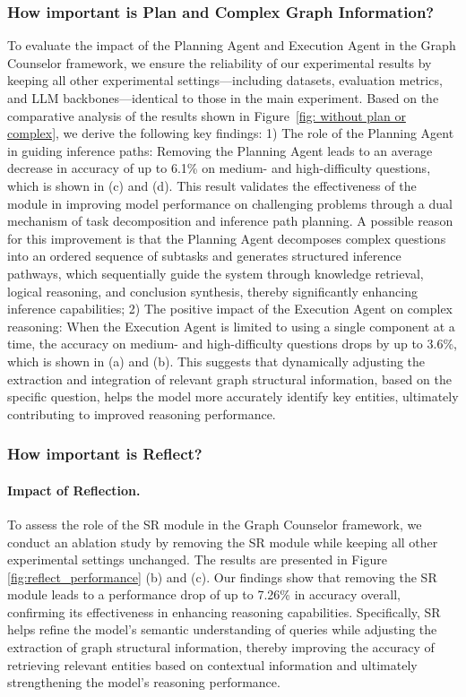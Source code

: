 \documentclass[11pt]{article}
\begin{document}
\subsubsection{How important is Plan and Complex Graph Information?}
To evaluate the impact of the Planning Agent and Execution Agent in the Graph Counselor framework, we ensure the reliability of our experimental results by keeping all other experimental settings—including datasets, evaluation metrics, and LLM backbones—identical to those in the main experiment. Based on the comparative analysis of the results shown in Figure~\ref{fig: without plan or complex}, we derive the following key findings: 1) The role of the Planning Agent in guiding inference paths: Removing the Planning Agent leads to an average decrease in accuracy of up to 6.1\% on medium- and high-difficulty questions, which is shown in (c) and (d). This result validates the effectiveness of the module in improving model performance on challenging problems through a dual mechanism of task decomposition and inference path planning. A possible reason for this improvement is that the Planning Agent decomposes complex questions into an ordered sequence of subtasks and generates structured inference pathways, which sequentially guide the system through knowledge retrieval, logical reasoning, and conclusion synthesis, thereby significantly enhancing inference capabilities; 2) The positive impact of the Execution Agent on complex reasoning: When the Execution Agent is limited to using a single component at a time, the accuracy on medium- and high-difficulty questions drops by up to 3.6\%, which is shown in (a) and (b). This suggests that dynamically adjusting the extraction and integration of relevant graph structural information, based on the specific question, helps the model more accurately identify key entities, ultimately contributing to improved reasoning performance.

\subsubsection{How important is Reflect?}
\paragraph{Impact of Reflection.} To assess the role of the SR module in the Graph Counselor framework, we conduct an ablation study by removing the SR module while keeping all other experimental settings unchanged. The results are presented in Figure \ref{fig:reflect_performance} (b) and (c). Our findings show that removing the SR module leads to a performance drop of up to 7.26\% in accuracy overall, confirming its effectiveness in enhancing reasoning capabilities. Specifically, SR helps refine the model’s semantic understanding of queries while adjusting the extraction of graph structural information, thereby improving the accuracy of retrieving relevant entities based on contextual information and ultimately strengthening the model’s reasoning performance.
\end{document}
